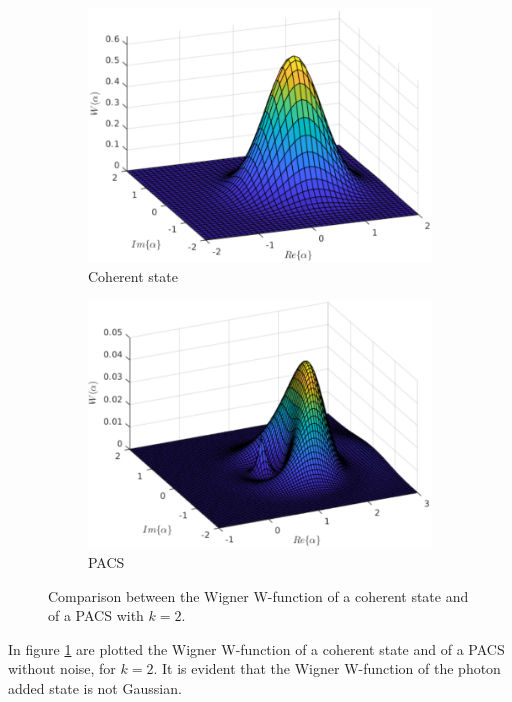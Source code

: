         \begin{figure}[tbp]
            \begin{center}
                \begin{subfigure}{0.49\textwidth}
                    \includegraphics[width=\linewidth]{Pictures/WigCohState.pdf}
                    \caption{Coherent state}
                \end{subfigure}
                \begin{subfigure}{0.49\textwidth}
                    \includegraphics[width=\linewidth]{Pictures/WigPACS.pdf}
                    \caption{PACS}
                \end{subfigure}
                \caption{Comparison between the Wigner W-function of a coherent state and 
                of a PACS with $k=2$.}
                \label{fig:WignerPACS}
            \end{center}
        \end{figure}
        In figure \ref{fig:WignerPACS} are plotted the Wigner W-function of a coherent
        state and of a PACS without noise, for $k=2$. It is evident that the Wigner 
        W-function of the photon added state is not Gaussian.

